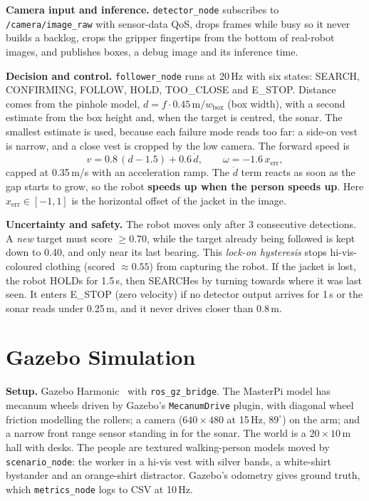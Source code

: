 \documentclass[10pt]{article}
\begin{document}
\textbf{Camera input and inference.} \texttt{detector\_node} subscribes to \texttt{/camera/image\_raw} with sensor-data QoS, drops frames while busy so it never builds a backlog, crops the gripper fingertips from the bottom of real-robot images, and publishes boxes, a debug image and its inference time.

\textbf{Decision and control.} \texttt{follower\_node} runs at 20\,Hz with six states: SEARCH, CONFIRMING, FOLLOW, HOLD, TOO\_CLOSE and E\_STOP. Distance comes from the pinhole model, $d = f \cdot 0.45\,\text{m} / w_{\text{box}}$ (box width), with a second estimate from the box height and, when the target is centred, the sonar. The smallest estimate is used, because each failure mode reads too far: a side-on vest is narrow, and a close vest is cropped by the low camera. The forward speed is
\begin{equation*}
v = 0.8\,(d - 1.5) + 0.6\,\dot d, \qquad \omega = -1.6\,x_{\text{err}},
\end{equation*}
capped at 0.35\,m/s with an acceleration ramp. The $\dot d$ term reacts as soon as the gap starts to grow, so the robot \textbf{speeds up when the person speeds up}. Here $x_{\text{err}} \in [-1,1]$ is the horizontal offset of the jacket in the image.

\textbf{Uncertainty and safety.} The robot moves only after 3 consecutive detections. A \emph{new} target must score $\geq 0.70$, while the target already being followed is kept down to 0.40, and only near its last bearing. This \emph{lock-on hysteresis} stops hi-vis-coloured clothing (scored $\approx 0.55$) from capturing the robot. If the jacket is lost, the robot HOLDs for 1.5\,s, then SEARCHes by turning towards where it was last seen. It enters E\_STOP (zero velocity) if no detector output arrives for 1\,s or the sonar reads under 0.25\,m, and it never drives closer than 0.8\,m.

\section{Gazebo Simulation}
\textbf{Setup.} Gazebo Harmonic~\cite{gazebo} with \texttt{ros\_gz\_bridge}. The MasterPi model has mecanum wheels driven by Gazebo's \texttt{MecanumDrive} plugin, with diagonal wheel friction modelling the rollers; a camera ($640\times480$ at 15\,Hz, $89^\circ$) on the arm; and a narrow front range sensor standing in for the sonar. The world is a $20\times10$\,m hall with desks. The people are textured walking-person models moved by \texttt{scenario\_node}: the worker in a hi-vis vest with silver bands, a white-shirt bystander and an orange-shirt distractor. Gazebo's odometry gives ground truth, which \texttt{metrics\_node} logs to CSV at 10\,Hz.
\end{document}
